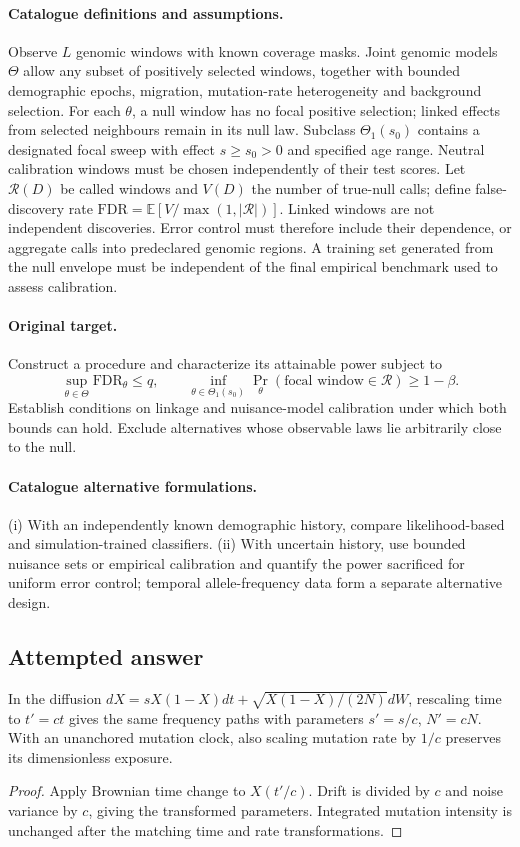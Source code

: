 \documentclass[11pt]{article}
\begin{document}
\paragraph{Catalogue definitions and assumptions.}
Observe $L$ genomic windows with known coverage masks. Joint genomic models $\Theta$ allow any subset of positively selected windows, together with bounded demographic epochs, migration, mutation-rate heterogeneity and background selection. For each $\theta$, a null window has no focal positive selection; linked effects from selected neighbours remain in its null law. Subclass $\Theta_1(s_0)$ contains a designated focal sweep with effect $s\ge s_0>0$ and specified age range. Neutral calibration windows must be chosen independently of their test scores. Let $\mathcal R(D)$ be called windows and $V(D)$ the number of true-null calls; define false-discovery rate $\mathrm{FDR}=\mathbb{E}[V/\max(1,|\mathcal R|)]$. Linked windows are not independent discoveries. Error control must therefore include their dependence, or aggregate calls into predeclared genomic regions. A training set generated from the null envelope must be independent of the final empirical benchmark used to assess calibration.
\paragraph{Original target.}
Construct a procedure and characterize its attainable power subject to
\[
 \sup_{\theta\in\Theta}\mathrm{FDR}_\theta\le q,
 \qquad
 \inf_{\theta\in\Theta_1(s_0)}
 \Pr_\theta(\text{focal window}\in\mathcal R)\ge1-\beta.
\]
Establish conditions on linkage and nuisance-model calibration under which both bounds can hold. Exclude alternatives whose observable laws lie arbitrarily close to the null.
\paragraph{Catalogue alternative formulations.}
(i) With an independently known demographic history, compare likelihood-based and simulation-trained classifiers. (ii) With uncertain history, use bounded nuisance sets or empirical calibration and quantify the power sacrificed for uniform error control; temporal allele-frequency data form a separate alternative design.
\subsection{Attempted answer}
\begin{proposition}
In the diffusion $dX=sX(1-X)dt+\sqrt{X(1-X)/(2N)}dW$, rescaling time to $t\prime=ct$ gives the same frequency paths with parameters $s\prime=s/c$, $N\prime=cN$. With an unanchored mutation clock, also scaling mutation rate by $1/c$ preserves its dimensionless exposure.
\end{proposition}
\begin{proof}
Apply Brownian time change to $X(t\prime/c)$. Drift is divided by $c$ and noise variance by $c$, giving the transformed parameters. Integrated mutation intensity is unchanged after the matching time and rate transformations.
\end{proof}
\end{document}
